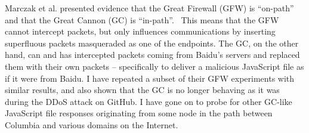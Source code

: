 Marczak et al. presented evidence that the Great Firewall (GFW) is “on-path” and that the Great Cannon (GC) is “in-path”.~\cite{Marczak2015}
This means that the GFW cannot intercept packets, but only influences communications by inserting superfluous packets masqueraded as one of the endpoints.
The GC, on the other hand, can and has intercepted packets coming from Baidu’s servers and replaced them with their own packets – specifically to deliver a malicious JavaScript file as if it were from Baidu.
I have repeated a subset of their GFW experiments with similar results, and also shown that the GC is no longer behaving as it was during the DDoS attack on GitHub.
I have gone on to probe for other GC-like JavaScript file responses originating from some node in the path between Columbia and various domains on the Internet.